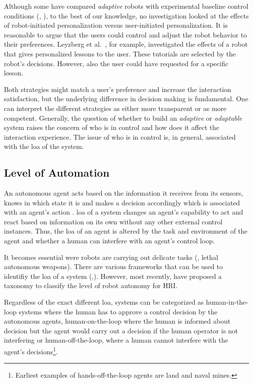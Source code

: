 \documentclass[twocolumn]{svjour3}          %
\begin{document}
Although some have compared \textit{adaptive} robots with experimental baseline
control conditions (\eg{}, \autocite{leite2011modelling,leyzberg2014personalizing}), to the
best of our knowledge, no investigation looked at the effects of robot-initiated
personalization versus user-initiated personalization. It is reasonable
to argue that the users could control and adjust the robot behavior to
their preferences. Leyzberg et al.~\autocite{leyzberg2014personalizing},
for example, investigated the effects of a robot that gives personalized
lessons to the user. These tutorials are selected by the robot's
decisions. However, also the user could have requested for a specific
lesson.

Both strategies might match a user's preference and increase the
interaction satisfaction, but the underlying difference in decision
making is fundamental. One can interpret the different strategies as
either more transparent or as more competent. Generally, the question of
whether to build an \textit{adaptive} or \textit{adaptable} system raises the concern of
who is in control and how does it affect the interaction experience. The
issue of who is in control is, in general, associated with the \gls{loa} of the system.

\hypertarget{level-of-automation}{%
\subsection{Level of Automation}\label{level-of-automation}}

An autonomous agent acts based on the information it receives from its
sensors, knows in which state it is and makes a decision accordingly
which is associated with an agent's action
\autocite[see][ch.~1]{russell2016artificial}. \gls{loa} of a system changes an
agent's capability to act and react based on information on its own
without any other external control instances. Thus, the \gls{loa} of an agent
is altered by the task and environment of the agent and whether a human
can interfere with an agent's control loop.

It becomes essential were robots are carrying out delicate tasks (\eg{},
lethal autonomous weapons). There are various frameworks that can be
used to identifiy the \gls{loa} of a system
(\eg{},\autocite{sheridan1978human,endsley1995out}). However, most
recently, \autocite{beer2014toward} have proposed a taxonomy to classify
the level of robot autonomy for HRI.

Regardless of the exact different \gls{loa}, systems can be categorized as
human-in-the-loop systems where the human has to approve a control
decision by the autonomous agents, human-on-the-loop where the human is
informed about decision but the agent would carry out a decision if the
human operator is not interfering or human-off-the-loop, where a human
cannot interfere with the agent's
decisions\footnote{Earliest examples of hands-off-the-loop agents are land and naval mines.}.
\end{document}
